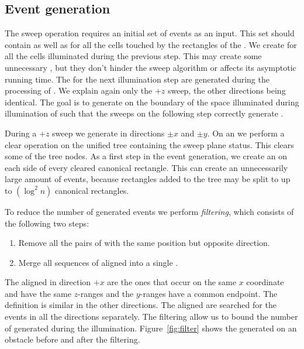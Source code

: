 \documentclass[english,gradu]{tktltiki2018}
\begin{document}
\subsection{Event generation}\label{sec:evtgen}

The sweep operation requires an initial set of events as an input.
This set should contain \addEs as well as \cellEs for all the cells touched by the rectangles of the \addEs.
We create \cellEs for all the cells illuminated during the previous step.
This may create some unnecessary \cellEs, but they don't hinder the sweep algorithm or affects its asymptotic running time.
The \addEs for the next illumination step are generated during the processing of \obsEs.
We explain again only the $+z$ sweep, the other directions being identical.
The goal is to generate \addEs on the boundary of the space illuminated during illumination of  such that the sweeps on the following step correctly generate .

During a $+z$ sweep we generate \addEs in directions $\pm x$ and $\pm y$.
On an \obsE we perform a clear operation on the unified tree containing the sweep plane status.
This clears some of the tree nodes.
As a first step in the event generation, we create an \addE on each side of every cleared canonical rectangle.
This can create an unnecessarily large amount of events, because rectangles added to the tree may be split to up to $(\log^2 n)$ canonical rectangles.

To reduce the number of generated events we perform \emph{filtering}, which consists of the following two steps:
\begin{enumerate}
\item Remove all the pairs of \addEs with the same position but opposite direction.
\item Merge all sequences of aligned \addEs into a single \addE.
\end{enumerate}

The aligned \addEs in direction $+x$ are the ones that occur on the same $x$ coordinate and have the same $z$-ranges and the $y$-ranges have a common endpoint.
The definition is similar in the other directions.
The aligned \addEs are searched for the events in all the directions separately.
The filtering allow us to bound the number of \addEs generated during the illumination.
Figure~\ref{fig:filter} shows the generated \addEs on an obstacle before and after the filtering.
\end{document}
